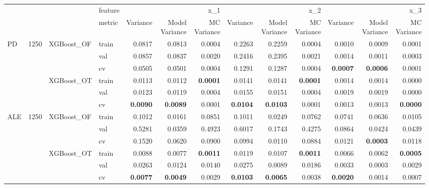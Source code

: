\begin{tabular}{llllrrrrrrrrr}
 &  &  & feature & \multicolumn{3}{r}{x_1} & \multicolumn{3}{r}{x_2} & \multicolumn{3}{r}{x_3} \\
 &  &  & metric & Variance & Model Variance & MC Variance & Variance & Model Variance & MC Variance & Variance & Model Variance & MC Variance \\
\multirow[c]{6}{*}{PD} & \multirow[c]{6}{*}{1250} & \multirow[c]{3}{*}{XGBoost_OF} & train & 0.0817 & 0.0813 & 0.0004 & 0.2263 & 0.2259 & 0.0004 & 0.0010 & 0.0009 & 0.0001 \\
 &  &  & val & 0.0857 & 0.0837 & 0.0020 & 0.2416 & 0.2395 & 0.0021 & 0.0014 & 0.0011 & 0.0003 \\
 &  &  & cv & 0.0505 & 0.0501 & 0.0004 & 0.1291 & 0.1287 & 0.0004 & \bfseries 0.0007 & \bfseries 0.0006 & 0.0001 \\
 &  & \multirow[c]{3}{*}{XGBoost_OT} & train & 0.0113 & 0.0112 & \bfseries 0.0001 & 0.0141 & 0.0141 & \bfseries 0.0001 & 0.0014 & 0.0014 & 0.0000 \\
 &  &  & val & 0.0123 & 0.0119 & 0.0004 & 0.0155 & 0.0151 & 0.0004 & 0.0019 & 0.0019 & 0.0000 \\
 &  &  & cv & \bfseries 0.0090 & \bfseries 0.0089 & 0.0001 & \bfseries 0.0104 & \bfseries 0.0103 & 0.0001 & 0.0013 & 0.0013 & \bfseries 0.0000 \\
\multirow[c]{6}{*}{ALE} & \multirow[c]{6}{*}{1250} & \multirow[c]{3}{*}{XGBoost_OF} & train & 0.1012 & 0.0161 & 0.0851 & 0.1011 & 0.0249 & 0.0762 & 0.0741 & 0.0636 & 0.0105 \\
 &  &  & val & 0.5281 & 0.0359 & 0.4923 & 0.6017 & 0.1743 & 0.4275 & 0.0864 & 0.0424 & 0.0439 \\
 &  &  & cv & 0.1520 & 0.0620 & 0.0900 & 0.0994 & 0.0110 & 0.0884 & 0.0121 & \bfseries 0.0003 & 0.0118 \\
 &  & \multirow[c]{3}{*}{XGBoost_OT} & train & 0.0088 & 0.0077 & \bfseries 0.0011 & 0.0119 & 0.0107 & \bfseries 0.0011 & 0.0066 & 0.0062 & \bfseries 0.0005 \\
 &  &  & val & 0.0263 & 0.0124 & 0.0140 & 0.0275 & 0.0089 & 0.0186 & 0.0033 & 0.0003 & 0.0029 \\
 &  &  & cv & \bfseries 0.0077 & \bfseries 0.0049 & 0.0029 & \bfseries 0.0103 & \bfseries 0.0065 & 0.0038 & \bfseries 0.0020 & 0.0014 & 0.0007 \\
\end{tabular}
